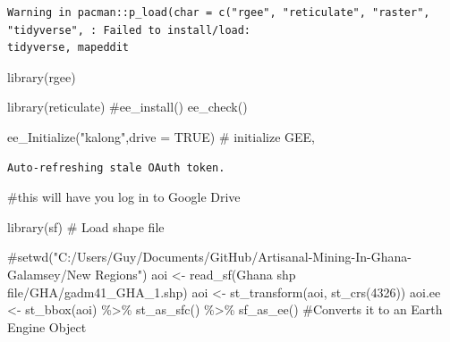 \documentclass[
  letterpaper,
  DIV=11,
  numbers=noendperiod]{scrartcl}
\newenvironment{Shaded}{\begin{snugshade}}{\end{snugshade}}
\newcommand{\AttributeTok}[1]{\textcolor[rgb]{0.40,0.45,0.13}{#1}}
\newcommand{\CommentTok}[1]{\textcolor[rgb]{0.37,0.37,0.37}{#1}}
\newcommand{\ConstantTok}[1]{\textcolor[rgb]{0.56,0.35,0.01}{#1}}
\newcommand{\DecValTok}[1]{\textcolor[rgb]{0.68,0.00,0.00}{#1}}
\newcommand{\FunctionTok}[1]{\textcolor[rgb]{0.28,0.35,0.67}{#1}}
\newcommand{\NormalTok}[1]{\textcolor[rgb]{0.00,0.23,0.31}{#1}}
\newcommand{\OtherTok}[1]{\textcolor[rgb]{0.00,0.23,0.31}{#1}}
\newcommand{\SpecialCharTok}[1]{\textcolor[rgb]{0.37,0.37,0.37}{#1}}
\newcommand{\StringTok}[1]{\textcolor[rgb]{0.13,0.47,0.30}{#1}}
\begin{document}
\begin{verbatim}
Warning in pacman::p_load(char = c("rgee", "reticulate", "raster", "tidyverse", : Failed to install/load:
tidyverse, mapeddit
\end{verbatim}

\begin{Shaded}
\begin{Highlighting}[]
\FunctionTok{library}\NormalTok{(rgee)}

\FunctionTok{library}\NormalTok{(reticulate)}
\CommentTok{\#ee\_install()}
\FunctionTok{ee\_check}\NormalTok{()}

\FunctionTok{ee\_Initialize}\NormalTok{(}\StringTok{"kalong"}\NormalTok{,}\AttributeTok{drive =} \ConstantTok{TRUE}\NormalTok{) }\CommentTok{\# initialize GEE,}
\end{Highlighting}
\end{Shaded}

\begin{verbatim}
Auto-refreshing stale OAuth token.
\end{verbatim}

\begin{Shaded}
\begin{Highlighting}[]
\CommentTok{\#this will have you log in to Google Drive}
\end{Highlighting}
\end{Shaded}

\begin{Shaded}
\begin{Highlighting}[]
\FunctionTok{library}\NormalTok{(}\StringTok{\textquotesingle{}sf\textquotesingle{}}\NormalTok{)}
\CommentTok{\# Load shape file}

\CommentTok{\#setwd("C:/Users/Guy/Documents/GitHub/Artisanal{-}Mining{-}In{-}Ghana{-}Galamsey/New Regions")}
\NormalTok{aoi }\OtherTok{\textless{}{-}} \FunctionTok{read\_sf}\NormalTok{(}\StringTok{\textquotesingle{}Ghana shp file/GHA/gadm41\_GHA\_1.shp\textquotesingle{}}\NormalTok{)}
\NormalTok{aoi }\OtherTok{\textless{}{-}} \FunctionTok{st\_transform}\NormalTok{(aoi, }\FunctionTok{st\_crs}\NormalTok{(}\DecValTok{4326}\NormalTok{))}
\NormalTok{aoi.ee }\OtherTok{\textless{}{-}} \FunctionTok{st\_bbox}\NormalTok{(aoi) }\SpecialCharTok{\%\textgreater{}\%}
\FunctionTok{st\_as\_sfc}\NormalTok{() }\SpecialCharTok{\%\textgreater{}\%}
\FunctionTok{sf\_as\_ee}\NormalTok{() }\CommentTok{\#Converts it to an Earth Engine Object}
\end{Highlighting}
\end{Shaded}
\end{document}
